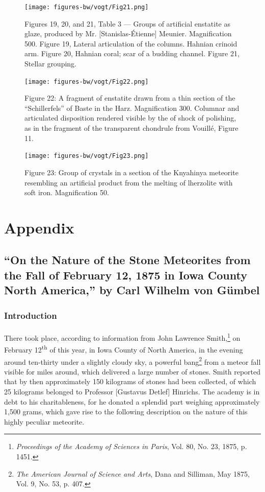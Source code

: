 \documentclass[a4paper, 12pt, oneside]{article}
\begin{document}
\clearpage
\begin{figure}[b]
\centering
\texttt{[image: figures-bw/vogt/Fig21.png]}
\caption{Figures 19, 20, and 21, Table 3 --- Groups of artificial enstatite as glaze, produced by Mr. [Stanislas-Étienne] Meunier. Magnification 500. Figure 19, Lateral articulation of the columns. Hahnian crinoid arm. Figure 20, Hahnian coral; scar of a budding channel. Figure 21, Stellar grouping.}
\end{figure}
\clearpage
\begin{figure}[b]
\centering
\texttt{[image: figures-bw/vogt/Fig22.png]}
\caption{Figure 22: A fragment of enstatite drawn from a thin section of the ``Schillerfels'' of Baste in the Harz. Magnification 300. Columnar and articulated disposition rendered visible by the of shock of polishing, as in the fragment of the transparent chondrule from Vouillé, Figure 11.}
\end{figure}
\clearpage
\begin{figure}[b]
\texttt{[image: figures-bw/vogt/Fig23.png]}
\caption{Figure 23: Group of crystals in a section of the Knyahinya meteorite resembling an artificial product from the melting of lherzolite with soft iron. Magnification 50.}
\centering
\end{figure}
\clearpage
\pagestyle{plain}
\section{Appendix}
\subsection{``On the Nature of the Stone Meteorites from the Fall of February 12, 1875 in Iowa County North America,'' by Carl Wilhelm von Gümbel}
\subsubsection*{Introduction}
\paragraph*{}
There took place, according to information from John Lawrence Smith,\footnote{\emph{Proceedings of the Academy of Sciences in Paris}, Vol. 80, No. 23, 1875, p. 1451.} on February 12\textsuperscript{th} of this year, in Iowa County of North America, in the evening around ten-thirty under a slightly cloudy sky, a powerful bang\footnote{\emph{The American Journal of Science and Arts}, Dana and Silliman, May 1875, Vol. 9, No. 53, p. 407.} from a meteor fall visible for miles around, which delivered a large number of stones. Smith reported that by then approximately 150 kilograms of stones had been collected, of which 25 kilograms belonged to Professor [Gustavus Detlef] Hinrichs. The academy is in debt to his charitableness, for he donated a splendid part weighing approximately 1,500 grams, which gave rise to the following description on the nature of this highly peculiar meteorite.
\end{document}
